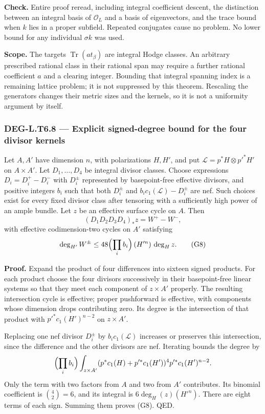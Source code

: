 \textbf{Check.} Entire proof reread, including integral coefficient descent, the distinction between an integral basis of \(\mathcal O_L\) and a basis of eigenvectors, and the trace bound when \(k\) lies in a proper subfield. Repeated conjugates cause no problem. No lower bound for any individual \(\sigma k\) was used.

\textbf{Scope.} The targets \(\operatorname{Tr}(a t_\beta)\) are integral Hodge classes. An arbitrary prescribed rational class in their rational span may require a further rational coefficient \(a\) and a clearing integer. Bounding that integral spanning index is a remaining lattice problem; it is not suppressed by this theorem. Rescaling the generators changes their metric sizes and the kernels, so it is not a uniformity argument by itself.

\subsubsection{DEG-L.T6.8 --- Explicit signed-degree bound for the four divisor kernels}\label{DEG-L.T6.8}

Let \(A,A'\) have dimension \(n\), with polarizations \(H,H'\), and put \(\mathscr L=p^*H\otimes p'^*H'\) on \(A\times A'\). Let \(D_1,\ldots,D_4\) be integral divisor classes. Choose expressions \(D_i=D_i^+-D_i^-\) with \(D_i^\pm\) represented by basepoint-free effective divisors, and positive integers \(b_i\) such that both \(D_i^\pm\) and \(b_i c_1(\mathscr L)-D_i^\pm\) are nef. Such choices exist for every fixed divisor class after tensoring with a sufficiently high power of an ample bundle. Let \(z\) be an effective surface cycle on \(A\). Then \[
(D_1D_2D_3D_4)_*z=W^+-W^-,
\] with effective codimension-two cycles on \(A'\) satisfying \[
\deg_{H'}W^\pm\le48\Bigl(\prod_i b_i\Bigr)\,(H'^n)\,\deg_H z.
\tag{G8}
\]

\textbf{Proof.} Expand the product of four differences into sixteen signed products. For each product choose the four divisors successively in their basepoint-free linear systems so that they meet each component of \(z\times A'\) properly. The resulting intersection cycle is effective; proper pushforward is effective, with components whose dimension drops contributing zero. Its degree is the intersection of that product with \(p'^*c_1(H')^{n-2}\) on \(z\times A'\).

Replacing one nef divisor \(D_i^\pm\) by \(b_i c_1(\mathscr L)\) increases or preserves this intersection, since the difference and the other divisors are nef. Iterating bounds the degree by \[
\Bigl(\prod_i b_i\Bigr)
\int_{z\times A'}(p^*c_1(H)+p'^*c_1(H'))^4p'^*c_1(H')^{n-2}.
\] Only the term with two factors from \(A\) and two from \(A'\) contributes. Its binomial coefficient is \(\binom42=6\), and its integral is \(6\deg_H(z)(H'^n)\). There are eight terms of each sign. Summing them proves (G8). QED.


